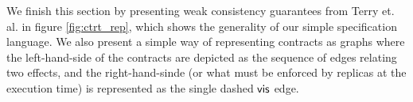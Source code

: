 We finish this section by presenting weak consistency guarantees from
Terry et. al. in figure \ref{fig:ctrt_rep}, which shows the generality
of our simple specification language. We also present a simple way of
representing contracts as graphs where the left-hand-side of the
contracts are depicted as the sequence of edges relating two effects,
and the right-hand-sinde (or what must be enforced by replicas at the
execution time) is represented as the single dashed ${\normalfont \textsf{vis}}$ edge.
%
